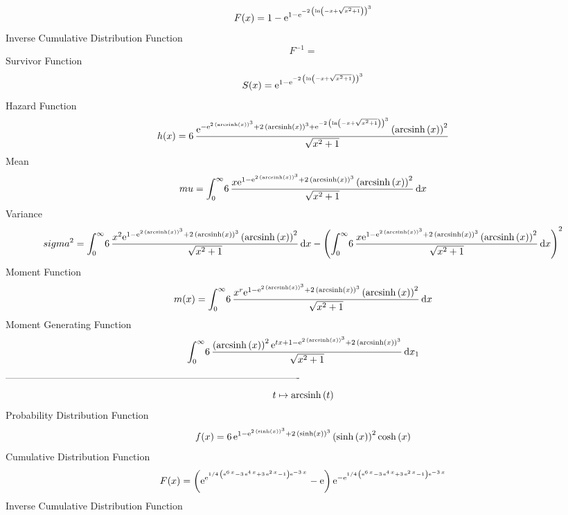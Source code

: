 \documentclass[12pt]{article}
\begin{document}
 $$F(x)=1-{{\rm e}^{1-{{\rm e}^{-2\, \left( \ln  \left( -x+\sqrt {{x}^{2}+1}
 \right)  \right) ^{3}}}}}
$$ Inverse Cumulative Distribution Function 
  $$F^{-1} = 
$$Survivor Function 
 $$ S(x)={{\rm e}^{1-{{\rm e}^{-2\, \left( \ln  \left( -x+\sqrt {{x}^{2}+1}
 \right)  \right) ^{3}}}}}
$$ Hazard Function 
 $$ h(x)=6\,{\frac {{{\rm e}^{-{{\rm e}^{2\, \left( {\rm arcsinh} \left(x
\right) \right) ^{3}}}+2\, \left( {\rm arcsinh} \left(x\right)
 \right) ^{3}+{{\rm e}^{-2\, \left( \ln  \left( -x+\sqrt {{x}^{2}+1}
 \right)  \right) ^{3}}}}} \left( {\rm arcsinh} \left(x\right)
 \right) ^{2}}{\sqrt {{x}^{2}+1}}}
$$Mean 
 $$ mu=\int_{0}^{\infty }\!6\,{\frac {x{{\rm e}^{1-{{\rm e}^{2\, \left( 
{\rm arcsinh} \left(x\right) \right) ^{3}}}+2\, \left( {\rm arcsinh} 
\left(x\right) \right) ^{3}}} \left( {\rm arcsinh} \left(x\right)
 \right) ^{2}}{\sqrt {{x}^{2}+1}}}\,{\rm d}x
$$ Variance 
 $$ sigma^2 = \int_{0}^{\infty }\!6\,{\frac {{x}^{2}{{\rm e}^{1-{{\rm e}^{2\,
 \left( {\rm arcsinh} \left(x\right) \right) ^{3}}}+2\, \left( 
{\rm arcsinh} \left(x\right) \right) ^{3}}} \left( {\rm arcsinh} 
\left(x\right) \right) ^{2}}{\sqrt {{x}^{2}+1}}}\,{\rm d}x- \left( 
\int_{0}^{\infty }\!6\,{\frac {x{{\rm e}^{1-{{\rm e}^{2\, \left( 
{\rm arcsinh} \left(x\right) \right) ^{3}}}+2\, \left( {\rm arcsinh} 
\left(x\right) \right) ^{3}}} \left( {\rm arcsinh} \left(x\right)
 \right) ^{2}}{\sqrt {{x}^{2}+1}}}\,{\rm d}x \right) ^{2}
$$Moment Function 
 $$ m(x) = \int_{0}^{\infty }\!6\,{\frac {{x}^{r}{{\rm e}^{1-{{\rm e}^{2\,
 \left( {\rm arcsinh} \left(x\right) \right) ^{3}}}+2\, \left( 
{\rm arcsinh} \left(x\right) \right) ^{3}}} \left( {\rm arcsinh} 
\left(x\right) \right) ^{2}}{\sqrt {{x}^{2}+1}}}\,{\rm d}x
$$ Moment Generating Function 
 $$\int_{0}^{\infty }\!6\,{\frac { \left( {\rm arcsinh} \left(x\right)
 \right) ^{2}{{\rm e}^{tx+1-{{\rm e}^{2\, \left( {\rm arcsinh} \left(x
\right) \right) ^{3}}}+2\, \left( {\rm arcsinh} \left(x\right)
 \right) ^{3}}}}{\sqrt {{x}^{2}+1}}}\,{\rm d}x_{{1}}
$$-------------------------------------------------------------------------------------------  \\$$t\mapsto {\rm arcsinh} \left(t\right)
$$Probability Distribution Function 
$$  f(x)=6\,{{\rm e}^{1-{{\rm e}^{2\, \left( \sinh \left( x \right)  \right) ^{
3}}}+2\, \left( \sinh \left( x \right)  \right) ^{3}}} \left( \sinh
 \left( x \right)  \right) ^{2}\cosh \left( x \right) 
$$Cumulative Distribution Function  
 $$F(x)= \left( {{\rm e}^{{{\rm e}^{1/4\, \left( {{\rm e}^{6\,x}}-3\,{{\rm e}^
{4\,x}}+3\,{{\rm e}^{2\,x}}-1 \right) {{\rm e}^{-3\,x}}}}}}-{\rm e}
 \right) {{\rm e}^{-{{\rm e}^{1/4\, \left( {{\rm e}^{6\,x}}-3\,{
{\rm e}^{4\,x}}+3\,{{\rm e}^{2\,x}}-1 \right) {{\rm e}^{-3\,x}}}}}}
$$ Inverse Cumulative Distribution Function 
\end{document}
